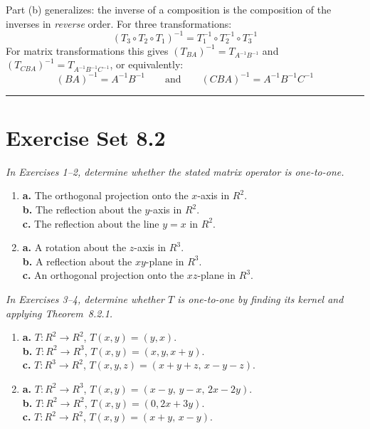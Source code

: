\documentclass{article}
\begin{document}
Part (b) generalizes: the inverse of a composition is the composition of the inverses
in \emph{reverse} order. For three transformations:
\begin{equation}
  (T_3\circ T_2\circ T_1)^{-1} = T_1^{-1}\circ T_2^{-1}\circ T_3^{-1} \tag{8}
\end{equation}
For matrix transformations this gives $(T_{BA})^{-1} = T_{A^{-1}B^{-1}}$ and
$(T_{CBA})^{-1} = T_{A^{-1}B^{-1}C^{-1}}$, or equivalently:
\begin{equation}
  (BA)^{-1} = A^{-1}B^{-1} \qquad \text{and} \qquad (CBA)^{-1} = A^{-1}B^{-1}C^{-1} \tag{9}
\end{equation}

\vspace{3mm}
\noindent\rule{\linewidth}{0.5pt}

\section*{Exercise Set 8.2}

\noindent\textit{In Exercises 1--2, determine whether the stated matrix operator is one-to-one.}

\begin{enumerate}
  \item \textbf{a.} The orthogonal projection onto the $x$-axis in $R^2$.\\
        \textbf{b.} The reflection about the $y$-axis in $R^2$.\\
        \textbf{c.} The reflection about the line $y=x$ in $R^2$.

  \item[2.] \textbf{a.} A rotation about the $z$-axis in $R^3$.\\
        \textbf{b.} A reflection about the $xy$-plane in $R^3$.\\
        \textbf{c.} An orthogonal projection onto the $xz$-plane in $R^3$.

\end{enumerate}

\noindent\textit{In Exercises 3--4, determine whether $T$ is one-to-one by finding its kernel
and applying Theorem~8.2.1.}

\begin{enumerate}
  \item[3.] \textbf{a.} $T : R^2 \to R^2$, $T(x,y)=(y,x)$.\\
        \textbf{b.} $T : R^2 \to R^3$, $T(x,y)=(x,y,x+y)$.\\
        \textbf{c.} $T : R^3 \to R^2$, $T(x,y,z)=(x+y+z,\,x-y-z)$.

  \item[4.] \textbf{a.} $T : R^2 \to R^3$, $T(x,y)=(x-y,\,y-x,\,2x-2y)$.\\
        \textbf{b.} $T : R^2 \to R^2$, $T(x,y)=(0,2x+3y)$.\\
        \textbf{c.} $T : R^2 \to R^2$, $T(x,y)=(x+y,\,x-y)$.

\end{enumerate}
\end{document}

